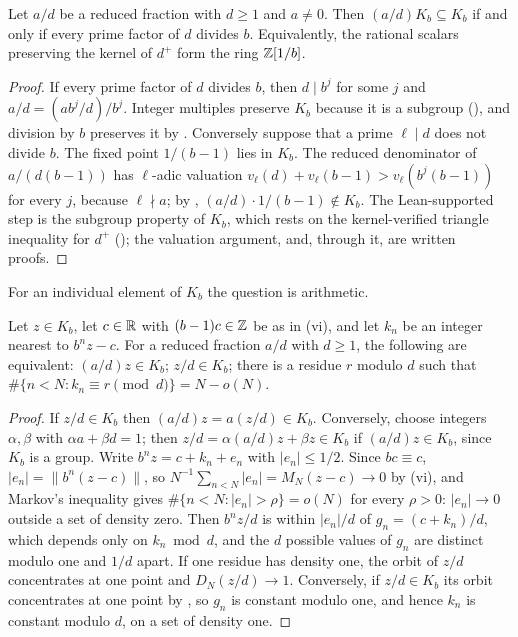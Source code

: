 \documentclass[11pt]{article}
\newcommand{\dist}[1]{\lVert #1\rVert}
\begin{document}
\begin{theorem}\label{thm:scalars}
Let $a/d$ be a reduced fraction with $d\ge1$ and $a\ne0$. Then $(a/d)K_b\subseteq K_b$ if and only if
every prime factor of $d$ divides $b$. Equivalently, the rational scalars preserving the kernel of
$d^+$ form the ring $\mathbb Z[1/b]$.
\end{theorem}

\begin{proof}
If every prime factor of $d$ divides $b$, then $d\mid b^j$ for some $j$ and $a/d=(ab^j/d)/b^j$. Integer
multiples preserve $K_b$ because it is a subgroup (), and division by $b$
preserves it by . Conversely suppose that a prime $\ell\mid d$ does not divide $b$.
The fixed point $1/(b-1)$ lies in $K_b$. The reduced denominator of $a/(d(b-1))$ has $\ell$-adic
valuation $v_\ell(d)+v_\ell(b-1)>v_\ell(b^j(b-1))$ for every $j$, because $\ell\nmid a$; by
, $(a/d)\cdot1/(b-1)\notin K_b$. The Lean-supported step is the subgroup property of
$K_b$, which rests on the kernel-verified triangle inequality for $d^+$ (); the
valuation argument,  and, through it,  are written proofs.
\end{proof}

For an individual element of $K_b$ the question is arithmetic.

\begin{proposition}\label{prop:residue}
Let $z\in K_b$, let $c\in\mathbb R$ with $(b-1)c\in\mathbb Z$ be as in \textup{(vi)}, and let
$k_n$ be an integer nearest to $b^nz-c$. For a reduced fraction $a/d$ with $d\ge1$, the following are
equivalent: $(a/d)z\in K_b$; $z/d\in K_b$; there is a residue $r$ modulo $d$ such that
$\#\{n<N:k_n\equiv r\pmod d\}=N-o(N)$.
\end{proposition}

\begin{proof}
If $z/d\in K_b$ then $(a/d)z=a(z/d)\in K_b$. Conversely, choose integers $\alpha,\beta$ with
$\alpha a+\beta d=1$; then $z/d=\alpha(a/d)z+\beta z\in K_b$ if $(a/d)z\in K_b$, since $K_b$ is a group.
Write $b^nz=c+k_n+e_n$ with $|e_n|\le1/2$. Since $bc\equiv c$, $|e_n|=\dist{b^n(z-c)}$, so
$N^{-1}\sum_{n<N}|e_n|=M_N(z-c)\to0$ by \textup{(vi)}, and Markov's inequality gives
$\#\{n<N:|e_n|>\rho\}=o(N)$ for every $\rho>0$: $|e_n|\to0$ outside a set of density zero. Then $b^nz/d$ is within $|e_n|/d$ of $g_n=(c+k_n)/d$, which depends only on
$k_n\bmod d$, and the $d$ possible values of $g_n$ are distinct modulo one and $1/d$ apart. If one
residue has density one, the orbit of $z/d$ concentrates at one point and $D_N(z/d)\to1$. Conversely,
if $z/d\in K_b$ its orbit concentrates at one point by , so $g_n$ is constant modulo
one, and hence $k_n$ is constant modulo $d$, on a set of density one.
\end{proof}
\end{document}
